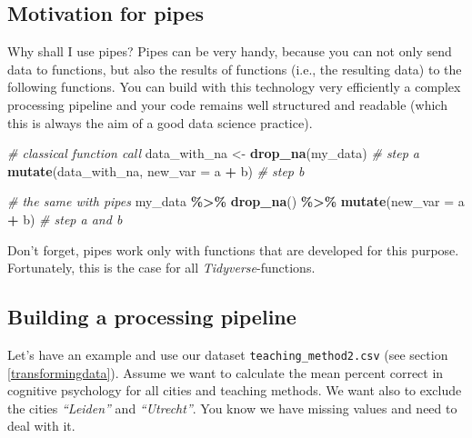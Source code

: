 \documentclass[
]{scrartcl}
\makeatletter
\newenvironment{Shaded}{\begin{snugshade}}{\end{snugshade}}
\newcommand{\AttributeTok}[1]{\textcolor[rgb]{0.13,0.29,0.53}{#1}}
\newcommand{\CommentTok}[1]{\textcolor[rgb]{0.56,0.35,0.01}{\textit{#1}}}
\newcommand{\FunctionTok}[1]{\textcolor[rgb]{0.13,0.29,0.53}{\textbf{#1}}}
\newcommand{\NormalTok}[1]{#1}
\newcommand{\OtherTok}[1]{\textcolor[rgb]{0.56,0.35,0.01}{#1}}
\newcommand{\SpecialCharTok}[1]{\textcolor[rgb]{0.81,0.36,0.00}{\textbf{#1}}}
\newenvironment{kframe}{%
\medskip{}
\setlength{\fboxsep}{.8em}
 \def\at@end@of@kframe{}%
 \ifinner\ifhmode%
  \def\at@end@of@kframe{\end{minipage}}%
  \begin{minipage}{\columnwidth}%
 \fi\fi%
 \def\FrameCommand##1{\hskip\@totalleftmargin \hskip-\fboxsep
 \colorbox{shadecolor}{##1}\hskip-\fboxsep
     \hskip-\linewidth \hskip-\@totalleftmargin \hskip\columnwidth}%
 \MakeFramed {\advance\hsize-\width
   \@totalleftmargin\z@ \linewidth\hsize
   \@setminipage}}%
 {\par\unskip\endMakeFramed%
 \at@end@of@kframe}
\newenvironment{rmdblock}[1]
  {
  \begin{itemize}
  \renewcommand{\labelitemi}{
    \raisebox{-.7\height}[0pt][0pt]{
      {\setkeys{Gin}{width=3em,keepaspectratio}\texttt{[image: images/\#1]}}
    }
  }
  \setlength{\fboxsep}{1em}
  \begin{kframe}
  \item
  }
  {
  \end{kframe}
  \end{itemize}
  }
\newenvironment{important}
    {\begin{rmdblock}{hint}}
    {\end{rmdblock}}
\makeatother
\begin{document}
\hypertarget{motivation-for-pipes}{%
\subsection{Motivation for pipes}\label{motivation-for-pipes}}

Why shall I use pipes? Pipes can be very handy, because you can not only send data to functions, but also the results of functions (i.e., the resulting data) to the following functions. You can build with this technology very efficiently a complex processing pipeline and your code remains well structured and readable (which this is always the aim of a good data science practice).

\begin{Shaded}
\begin{Highlighting}[]
\CommentTok{\# classical function call}
\NormalTok{data\_with\_na }\OtherTok{\textless{}{-}} \FunctionTok{drop\_na}\NormalTok{(my\_data)                }\CommentTok{\# step a}
\FunctionTok{mutate}\NormalTok{(data\_with\_na, }\AttributeTok{new\_var =}\NormalTok{ a }\SpecialCharTok{+}\NormalTok{ b) }\CommentTok{\# step b}

\CommentTok{\# the same with pipes}
\NormalTok{my\_data }\SpecialCharTok{\%\textgreater{}\%} \FunctionTok{drop\_na}\NormalTok{() }\SpecialCharTok{\%\textgreater{}\%} \FunctionTok{mutate}\NormalTok{(}\AttributeTok{new\_var =}\NormalTok{ a }\SpecialCharTok{+}\NormalTok{ b)  }\CommentTok{\# step a and b}
\end{Highlighting}
\end{Shaded}

\begin{important}
 Don't forget, pipes work only with functions that are developed for this
 purpose. Fortunately, this is the case for all
 \emph{Tidyverse}-functions.
 \end{important}

\hypertarget{building-a-processing-pipeline}{%
\subsection{Building a processing pipeline}\label{building-a-processing-pipeline}}

Let's have an example and use our dataset \texttt{teaching\_method2.csv} (see section \ref{transformingdata}). Assume we want to calculate the mean percent correct in cognitive psychology for all cities and teaching methods. We want also to exclude the cities \emph{``Leiden''} and \emph{``Utrecht''}. You know we have missing values and need to deal with it.
\end{document}
